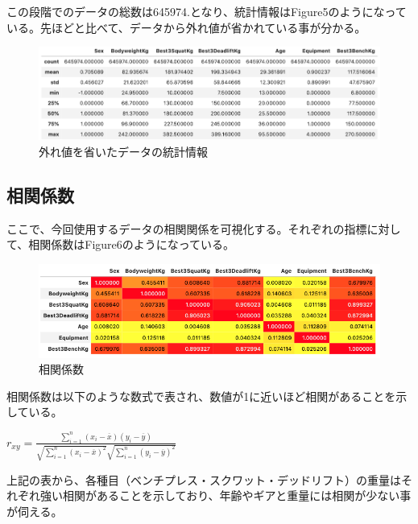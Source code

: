 \documentclass{article}
\begin{document}
この段階でのデータの総数は645974.となり、統計情報はFigure5のようになっている。先ほどと比べて、データから外れ値が省かれている事が分かる。

\begin{figure}[H]
\begin{center}
\includegraphics[width=\linewidth]{data_stats3.png}
\caption{外れ値を省いたデータの統計情報}
\end{center}
\end{figure}


\subsection{相関係数}

ここで、今回使用するデータの相関関係を可視化する。それぞれの指標に対して、相関係数はFigure6のようになっている。


\begin{figure}[H]
\begin{center}
\includegraphics[width=\linewidth]{corr.png}
\caption{相関係数}
\end{center}
\end{figure}

相関係数は以下のような数式で表され、数値が1に近いほど相関があることを示している。

\begin{center}
\begin{math}
r_{xy} = \frac{\displaystyle \sum_{i = 1}^n (x_i - \overline{x})
(y_i - \overline{y})}{\sqrt{\displaystyle \sum_{i = 1}^n 
(x_i - \overline{x})^2}\sqrt{\displaystyle \sum_{i = 1}^n 
(y_i - \overline{y})^2}}
\end{math}
\end{center}

上記の表から、各種目（ベンチプレス・スクワット・デッドリフト）の重量はそれぞれ強い相関があることを示しており、年齢やギアと重量には相関が少ない事が伺える。
\end{document}
